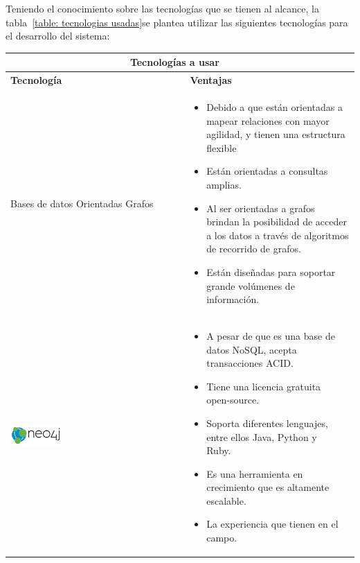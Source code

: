 \clearpage
\newpage
Teniendo el conocimiento sobre las tecnologías que se tienen al alcance, la tabla~\ref{table: tecnologias usadas}se plantea utilizar las siguientes tecnologías para el desarrollo del sistema:
\begin{table}[b!]
	\centering
	\vspace{33mm}
	\begin{tabular}{|p{2cm}|ll}
		\hline
		\multicolumn{2}{|c|}{{\bf Tecnologías a usar}} \\ 
		\hline
		\multicolumn{1}{|p{4cm}|}{{\bf Tecnología}}                                   &   
		\multicolumn{1}{p{10cm}|}{{\bf Ventajas}}\\
		\hline
		\multicolumn{1}{|p{5cm}|}{Bases de datos Orientadas  Grafos}                   &   
		\multicolumn{2}{p{10cm}|}{\begin{itemize}
		\vspace{-5mm}
		\item Debido a que están orientadas a mapear relaciones con mayor agilidad, y tienen una estructura flexible
		\item Están orientadas a consultas amplias. 
		\item Al ser orientadas a grafos brindan la posibilidad de acceder a los datos a través de algoritmos de recorrido de grafos.
		\item Están diseñadas para soportar grande volúmenes de información.
		\end{itemize}} \\
		\hline
		\multicolumn{1}{|p{5cm}|}{\includegraphics[width=0.3\textwidth]{images/neo4j}} &   
		\multicolumn{1}{p{10cm}|}{
		\begin{itemize}
		\vspace{-15mm}
		\item A pesar de que es una base de datos NoSQL, acepta transacciones ACID.
		\item Tiene una licencia gratuita open-source.
		\item Soporta diferentes lenguajes, entre ellos Java, Python y Ruby.
		\item Es una herramienta en crecimiento que es altamente escalable.
		\item La experiencia que tienen en el campo.
		\end{itemize}} \\ 
		       
		\hline
	\end{tabular}
\end{table}
